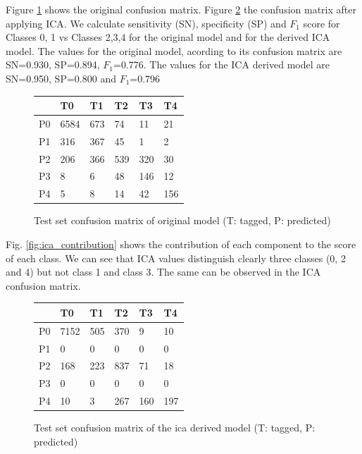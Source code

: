 \documentclass[review]{elsarticle}
\theoremstyle{definition} %
\theoremstyle{remark}
\begin{document}
Figure \ref{tab:cm_orig} shows the original confusion matrix. Figure \ref{tab:cm_ica} the confusion matrix after applying ICA. We calculate sensitivity (SN), specificity (SP) and $F_1$ score for Classes 0, 1 vs Classes 2,3,4 for the original model and for the derived ICA model. The values for the original model, acording to its confusion matrix are SN=0.930, SP=0.894, $F_1$=0.776. The values for the ICA derived model are SN=0.950, SP=0.800 and $F_1$=0.796
\begin{figure}
	\centering
	\begin{tabular}{l|lllll}
		& T0 & T1 & T2 & T3 & T4 \\
		\hline
		P0 & 6584 &  673 &  74 &  11 &  21 \\
		P1 & 316 &  367 &  45 &   1 &   2 \\
		P2 & 206 &  366 & 539 & 320 &  30 \\
		P3 & 8 &    6 &  48 & 146 &  12 \\
		P4 & 5 &    8 &  14 &  42 & 156 \\
	\end{tabular}
	\caption{Test set confusion matrix of original model (T: tagged, P: predicted)}
	\label{tab:cm_orig}	
\end{figure}

Fig. \ref{fig:ica_contribution} shows the contribution of each component to the score of each class. We can see that ICA values distinguish clearly three classes (0, 2 and 4) but not class 1 and class 3. The same can be observed in the ICA confusion matrix.



\begin{figure}
	\centering
	\begin{tabular}{l|lllll}
		& T0 & T1 & T2 & T3 & T4 \\
		\hline
		P0 & 7152 &  505 &  370 &  9 &  10 \\
		P1 & 0 &  0 &  0 &   0 &   0 \\
		P2 & 168 &  223 & 837 & 71 &  18 \\
		P3 & 0 &    0 &  0 & 0 &  0 \\
		P4 & 10 &   3 &  267 &  160 & 197 \\
	\end{tabular}
	\caption{Test set confusion matrix of the ica derived model (T: tagged, P: predicted)}
	\label{tab:cm_ica}	
\end{figure}
\end{document}
